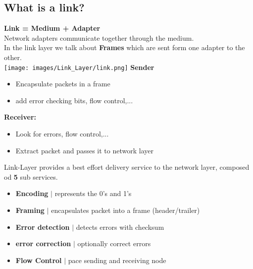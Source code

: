 \documentclass[a4paper, fontsize=8pt, landscape, DIV=1]{scrartcl}
\begin{document}
\begin{multicols*}{4}
   			\subsection{What is a link?}
   			\textbf{Link =  Medium + Adapter}\\
   			Network adapters communicate together through the medium.\\
   			In the link layer we talk about \textbf{Frames} which are sent form one adapter to the other.\\
   			\texttt{[image: images/Link\_Layer/link.png]} 
   			\textbf{Sender}
   			\vspace{-0.3cm}
   			\begin{itemize}[noitemsep]
   				\item Encapsulate packets in a frame
   				\item add error checking bits, flow control,...
   			\end{itemize}
   			\textbf{Receiver:}
   			\vspace{-0.3cm}
   			\begin{itemize}[noitemsep]
   				\item Look for errors, flow control,...
   				\item Extract packet and passes it to network layer 
   			\end{itemize}
   			Link-Layer provides a best effort delivery service to the network layer, composed od \textbf{5} sub services.
   			\begin{itemize}[noitemsep]
   				\item \textbf{Encoding} $\vert$ represents the 0's and 1's
   				\item \textbf{Framing} $\vert$ encapsulates packet into a frame (header/trailer)
   				\item \textbf{Error detection} $\vert$ detects errors with checksum
   				\item \textbf{error correction} $\vert$ optionally correct errors
   				\item \textbf{Flow Control} $\vert$ pace sending and receiving node 
   			\end{itemize} 
   			

\end{multicols*}
\end{document}
